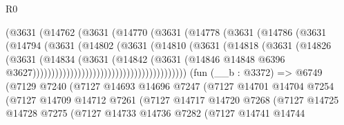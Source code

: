 \begin{lexlean}{R0}
\begin{coremodule}
                                      (@3631
                                        (@14762
                                          (@3631
                                            (@14770
                                              (@3631
                                                (@14778
                                                  (@3631
                                                    (@14786
                                                      (@3631
                                                        (@14794
                                                          (@3631
                                                            (@14802
                                                              (@3631
                                                                (@14810
                                                                  (@3631
                                                                    (@14818
                                                                      (@3631
                                                                        (@14826
                                                                          (@3631
                                                                            (@14834
                                                                              (@3631
                                                                                (@14842
                                                                                  (@3631
                                                                                    (@14846
                                                                                      @14848
                                                                                      @6396
                                                                                      @3627)))))))))))))))))))))))))))))))))))))))))
    (fun (__b : @3372) =>
    @6749
      (@7129
        @7240
        (@7127
          @14693
          @14696
          @7247
          (@7127
            @14701
            @14704
            @7254
            (@7127
              @14709
              @14712
              @7261
              (@7127
                @14717
                @14720
                @7268
                (@7127
                  @14725
                  @14728
                  @7275
                  (@7127
                    @14733
                    @14736
                    @7282
                    (@7127
                      @14741
                      @14744

\end{coremodule}
\end{lexlean}

